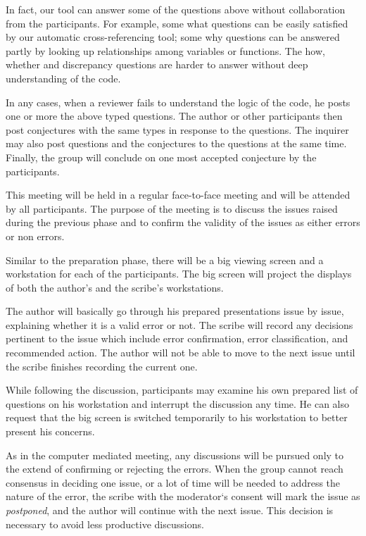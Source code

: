 \begin {itemize}
In fact, our tool can answer some of the questions above without
collaboration from the participants. For example,
some what questions can be easily satisfied by our automatic
cross-referencing tool; some why questions can be answered partly
by looking up relationships among variables or functions.
The how, whether and discrepancy questions are harder
to answer without deep understanding of the code. 

In any cases, when a reviewer fails to understand the logic of the code, 
he posts one or more the above typed questions.
The author or other participants then post conjectures
with the same types in response to the questions. 
The inquirer may also post questions and the conjectures
to the questions at the same time.  Finally, the group will
conclude on one most accepted conjecture by the participants.

\end {itemize}


This meeting will be held in a regular face-to-face meeting
and will be attended by all participants.
The purpose of the meeting is to discuss the issues raised during
the previous phase and to confirm the validity of the issues
as either errors or non errors.

Similar to the preparation phase, there will be a big viewing
screen and a workstation  for  each of the participants.
The big screen will project the displays of both the author's
and  the scribe's workstations.

The author will basically go through his prepared presentations
issue by issue, explaining whether it is a valid error or not.  
The scribe will record any decisions pertinent to the issue
which include error confirmation, error classification, and
recommended action.
The author will not be able to move to the next
issue until the scribe finishes recording the current one.  

While following the discussion, participants may examine his
own prepared list of questions on his workstation and 
interrupt the discussion any time.  He can also request that the big
screen is switched temporarily to his workstation to better
present his concerns.

As in the computer mediated meeting,
any discussions will be pursued only to the 
extend of confirming or rejecting the errors.  When the group
cannot reach consensus in deciding one issue, or a lot of
time will be needed to address the nature of the error,
the scribe with the moderator`s consent will mark the issue as
{\it postponed}, and the author will
continue with the next issue.  This decision is necessary
to avoid less productive discussions.


